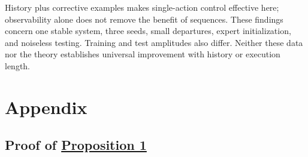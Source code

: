 \documentclass{l4dc2026}
\begin{document}
History plus corrective examples makes single-action control effective here; observability alone does not remove the benefit of sequences. These findings concern one stable system, three seeds, small departures, expert initialization, and noiseless testing. Training and test amplitudes also differ. Neither these data nor the theory establishes universal improvement with history or execution length.



\newpage
\section{Appendix}
\subsection{Proof of \hyperref[edeltaiosprop]{Proposition 1}}
\end{document}
